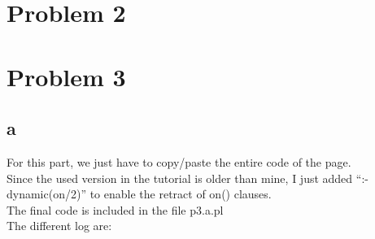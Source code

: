 \documentclass{article}
\begin{document}
    \section{Problem 2}
    \section{Problem 3}
        \subsection{a}
            For this part, we just have to copy/paste the entire code of the page.\\
            Since the used version in the tutorial is older than mine, I just added ``:-dynamic(on/2)'' to enable the retract of on() clauses.\\
            The final code is included in the file p3.a.pl\\
            The different log are:\\
\end{document}
